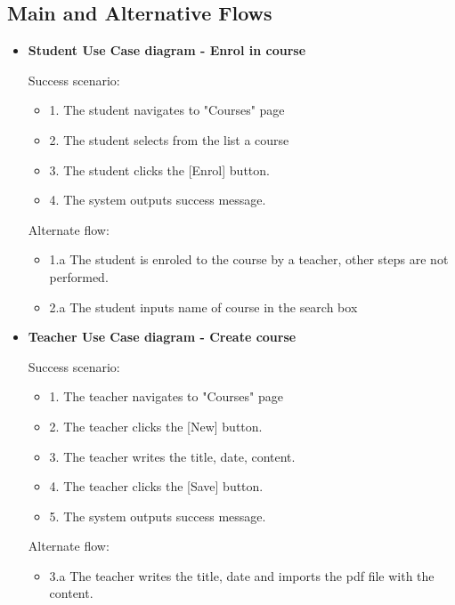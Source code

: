 \documentclass[12pt,a4paper,titlepage]{article}
\begin{document}
\subsection{Main and Alternative Flows}
\begin{itemize}
\item
\noindent\textbf{Student Use Case diagram - Enrol in course}
\begin{description}
    \item[Success scenario:]
\end{description}
\renewcommand{\labelenumii}{\arabic{enumii}}
\begin{itemize}
  \item 1. The student navigates to "Courses" page
  \item 2. The student selects from the list a course
  \item 3. The student clicks the [Enrol] button.
  \item 4. The system outputs success message.
\end{itemize}
\begin{description}
    \item[Alternate flow:]
\end{description}
\begin{itemize}
  \item 1.a The student is enroled to the course by a teacher, other steps are not performed.
  \item 2.a The student inputs name of course in the search box
\end{itemize}
\item
\noindent\textbf{Teacher Use Case diagram - Create course}
\begin{description}
    \item[Success scenario:]
\end{description}
\renewcommand{\labelenumii}{\arabic{enumii}}
\begin{itemize}
  \item 1. The teacher navigates to "Courses" page
  \item 2. The teacher clicks the [New] button.
  \item 3. The teacher writes the title, date, content.
  \item 4. The teacher clicks the [Save] button.
  \item 5. The system outputs success message.
\end{itemize}
\begin{description}
    \item[Alternate flow:]
\end{description}
\begin{itemize}
  \item 3.a The teacher writes the title, date and imports the pdf file with the content.
\end{itemize}


\end{itemize}
\end{document}
